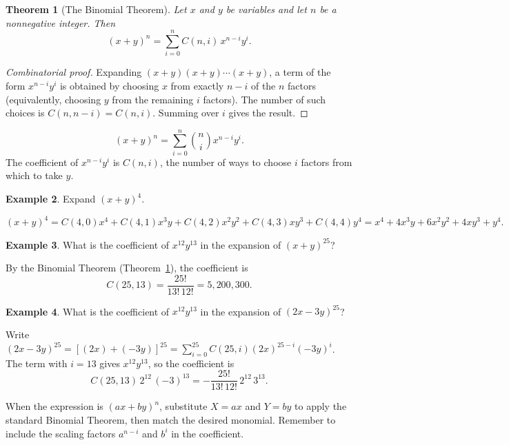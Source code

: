 \documentclass[11pt, a4paper, notitlepage]{report}
\newtheorem{theorem}{Theorem}[section]
\theoremstyle{definition}
\newtheorem{example}[theorem]{Example}
\theoremstyle{remark}
\begin{document}
\begin{theorem}[The Binomial Theorem]
\label{thm:binomial}
Let $x$ and $y$ be variables and let $n$ be a nonnegative integer.  Then
\[
  (x+y)^n = \sum_{i=0}^{n} C(n,i)\,x^{n-i}y^{i}.
\]
\end{theorem}

\begin{proof}[Combinatorial proof]
Expanding $(x+y)(x+y)\cdots(x+y)$, a term of the form $x^{n-i}y^{i}$ is obtained by choosing
$x$ from exactly $n-i$ of the $n$ factors (equivalently, choosing $y$ from the remaining $i$
factors).  The number of such choices is $C(n,n-i) = C(n,i)$.  Summing over $i$ gives the result.
\end{proof}

\begin{keyresult}[title={Key Result: Binomial Theorem}]
\[
  (x+y)^n = \sum_{i=0}^{n} \binom{n}{i} x^{n-i} y^{i}.
\]
The coefficient of $x^{n-i}y^{i}$ is $C(n,i)$, the number of ways to choose $i$ factors
from which to take $y$.
\end{keyresult}

\begin{example}
Expand $(x+y)^4$.

\[
  (x+y)^4 = C(4,0)x^4 + C(4,1)x^3y + C(4,2)x^2y^2 + C(4,3)xy^3 + C(4,4)y^4
           = x^4 + 4x^3y + 6x^2y^2 + 4xy^3 + y^4.
\]
\end{example}

\begin{example}
What is the coefficient of $x^{12}y^{13}$ in the expansion of $(x+y)^{25}$?

By the Binomial Theorem (Theorem~\ref{thm:binomial}), the coefficient is
\[
  C(25,13) = \frac{25!}{13!\,12!} = 5{,}200{,}300.
\]
\end{example}

\begin{example}
\label{ex:binomial-scaled}
What is the coefficient of $x^{12}y^{13}$ in the expansion of $(2x - 3y)^{25}$?

Write $(2x-3y)^{25} = [(2x)+(-3y)]^{25} = \sum_{i=0}^{25} C(25,i)(2x)^{25-i}(-3y)^{i}$.
The term with $i=13$ gives $x^{12}y^{13}$, so the coefficient is
\[
  C(25,13)\,2^{12}\,(-3)^{13} = -\frac{25!}{13!\,12!}\,2^{12}\,3^{13}.
\]
\end{example}

\begin{examtip}[title={Exam Tip: Scaled Binomial}]
When the expression is $(ax + by)^n$, substitute $X = ax$ and $Y = by$ to apply the
standard Binomial Theorem, then match the desired monomial.  Remember to include the
scaling factors $a^{n-i}$ and $b^i$ in the coefficient.
\end{examtip}
\end{document}
